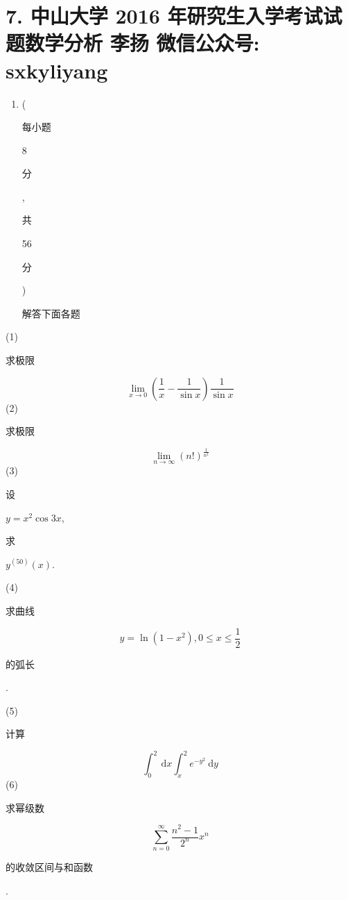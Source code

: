 \documentclass[10pt]{article}
\begin{document}
\section{7. 中山大学 2016 年研究生入学考试试题数学分析 
 李扬 
 微信公众号: sxkyliyang}
\begin{enumerate}
  \item (\begin{CJK}{UTF8}{mj}每小题\end{CJK} 8 \begin{CJK}{UTF8}{mj}分\end{CJK}, \begin{CJK}{UTF8}{mj}共\end{CJK} 56 \begin{CJK}{UTF8}{mj}分\end{CJK}) \begin{CJK}{UTF8}{mj}解答下面各题\end{CJK}
\end{enumerate}
(1) \begin{CJK}{UTF8}{mj}求极限\end{CJK}
$$
\lim _{x \rightarrow 0}\left(\frac{1}{x}-\frac{1}{\sin x}\right) \frac{1}{\sin x}
$$
(2) \begin{CJK}{UTF8}{mj}求极限\end{CJK}
$$
\lim _{n \rightarrow \infty}(n !)^{\frac{1}{n^{2}}}
$$
(3) \begin{CJK}{UTF8}{mj}设\end{CJK} $y=x^{2} \cos 3 x$, \begin{CJK}{UTF8}{mj}求\end{CJK} $y^{(50)}(x)$.

(4) \begin{CJK}{UTF8}{mj}求曲线\end{CJK}
$$
y=\ln \left(1-x^{2}\right), 0 \leq x \leq \frac{1}{2}
$$
\begin{CJK}{UTF8}{mj}的弧长\end{CJK}.

(5) \begin{CJK}{UTF8}{mj}计算\end{CJK}
$$
\int_{0}^{2} \mathrm{~d} x \int_{x}^{2} e^{-y^{2}} \mathrm{~d} y
$$
(6) \begin{CJK}{UTF8}{mj}求幂级数\end{CJK}
$$
\sum_{n=0}^{\infty} \frac{n^{2}-1}{2^{n}} x^{n}
$$
\begin{CJK}{UTF8}{mj}的收敛区间与和函数\end{CJK}.
\end{document}

